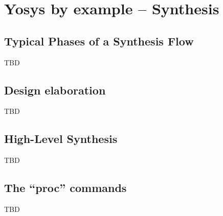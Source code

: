 
\section{Yosys by example -- Synthesis}

\begin{frame}
\sectionpage
\end{frame}


\subsection{Typical Phases of a Synthesis Flow}

\begin{frame}{\subsecname}
TBD
\end{frame}


\subsection{Design elaboration}

\begin{frame}{\subsecname}
TBD
\end{frame}


\subsection{High-Level Synthesis}

\begin{frame}{\subsecname}
TBD
\end{frame}


\subsection{The ``proc'' commands}

\begin{frame}{\subsecname}
TBD
\end{frame}


